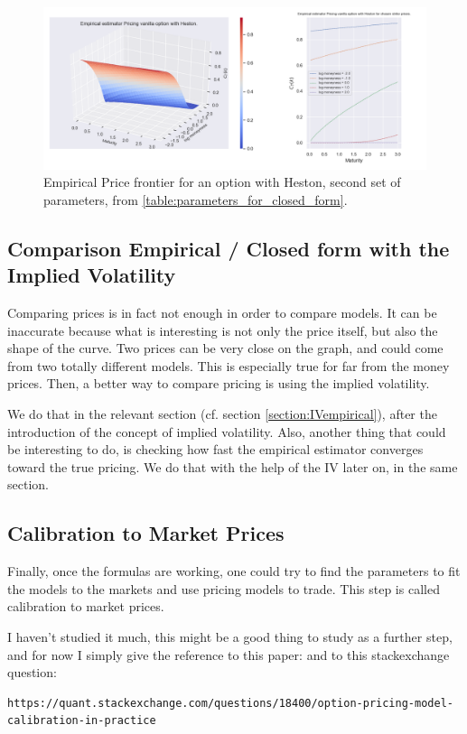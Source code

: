 \begin{figure}
\centering
   \includegraphics[width = 0.9 \textwidth]{../addition_part/images/integration_fft/empirical_pricing_5000_cover_new.png}
   \caption{Empirical Price frontier for an option with Heston, second set of parameters, from \ref{table:parameters_for_closed_form}.}
   \label{fig:new_param2_estim}
\end{figure}

\subsection{Comparison Empirical / Closed form with the Implied Volatility}

Comparing prices is in fact not enough in order to compare models. It can be inaccurate because what is interesting is not only the price itself, but also the shape of the curve. Two prices can be very close on the graph, and could come from two totally different models. This is especially true for far from the money prices. Then, a better way to compare pricing is using the implied volatility. 

We do that in the relevant section (cf. section \ref{section:IVempirical}), after the introduction of the concept of implied volatility. Also, another thing that could be interesting to do, is checking how fast the empirical estimator converges toward the true pricing. We do that with the help of the IV later on, in the same section.

\subsection{Calibration to Market Prices}
Finally, once the formulas are working, one could try to find the parameters to fit the models to the markets and use pricing models to trade. This step is called calibration to market prices.

I haven't studied it much, this might be a good thing to study as a further step, and for now I simply give the reference to this paper: \cite{ricardo} and to this stackexchange question: 
\begin{Verbatim}[fontsize = \tiny]
https://quant.stackexchange.com/questions/18400/option-pricing-model-calibration-in-practice
\end{Verbatim}







